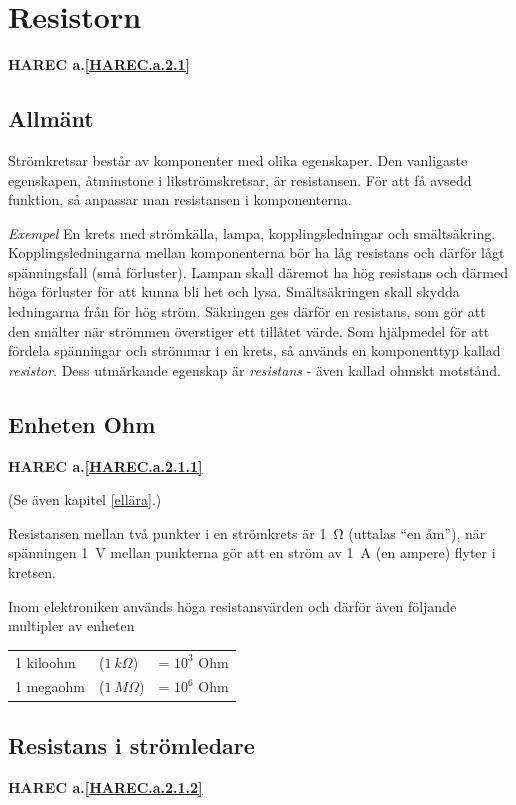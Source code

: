 \section{Resistorn}
\textbf{HAREC a.\ref{HAREC.a.2.1}\label{myHAREC.a.2.1}}

\subsection{Allmänt}

Strömkretsar består av komponenter med olika egenskaper.
Den vanligaste egenskapen, åtminstone i likströmskretsar, är resistansen.
För att få avsedd funktion, så anpassar man resistansen i komponenterna.

\emph{Exempel}
En krets med strömkälla, lampa, kopplingsledningar och smältsäkring.
Kopplingsledningarna mellan komponenterna bör ha låg resistans och därför lågt
spänningsfall (små förluster). Lampan skall däremot ha hög resistans och därmed
höga förluster för att kunna bli het och lysa. Smältsäkringen skall skydda
ledningarna från för hög ström. Säkringen ges därför en resistans, som gör
att den smälter när strömmen överstiger ett tillåtet värde.
Som hjälpmedel för att fördela spänningar och strömmar i en krets, så används
en komponenttyp kallad \emph{resistor}. Dess utmärkande egenskap är
\emph{resistans} - även kallad ohmskt motstånd.

\subsection{Enheten Ohm}
\textbf{HAREC a.\ref{HAREC.a.2.1.1}\label{myHAREC.a.2.1.1}}

(Se även kapitel \ref{ellära}.)

Resistansen mellan två punkter i en strömkrets är 1~Ω (uttalas
``en åm''), när spänningen 1~V mellan punkterna gör att en ström
av 1~A (en ampere) flyter i kretsen.

Inom elektroniken används höga resistansvärden och därför även följande
multipler av enheten
\begin{tabular}{lll}
  1 kiloohm & (\(1\ k\Omega\)) & = \(10^3\) Ohm \\
  1 megaohm & (\(1\ M\Omega\)) & = \(10^6\) Ohm \\
\end{tabular}

\subsection{Resistans i strömledare}
\textbf{HAREC a.\ref{HAREC.a.2.1.2}\label{myHAREC.a.2.1.2}}


